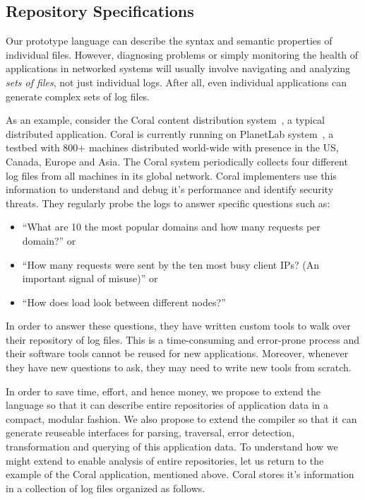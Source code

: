 \subsection{Repository Specifications}
\label{ssec:repo-spec}

Our prototype \pads{} language can describe the syntax and semantic properties
of individual files.  However, diagnosing problems or simply monitoring
the health of applications in networked systems
will usually involve navigating and analyzing {\em sets of files},
not just individual logs.  After all, even individual
applications can generate complex sets of log files.  

As an example, consider the Coral content
distribution system~\cite{coral}, a typical distributed application.
Coral is currently running on PlanetLab system~\cite{planetlab}, a
testbed with 800+ machines distributed world-wide with presence in the
US, Canada, Europe and Asia.  The Coral system periodically collects
four different log files from all machines in its global network.
Coral implementers use this information to understand and debug
it's performance and identify security threats.  They regularly probe the
logs to answer specific questions such as:
\begin{itemize}
\item ``What are 10 the most popular domains and how many requests per 
  domain?'' or
\item ``How many requests were sent by the ten most busy client IPs? (An important signal of misuse)'' or
\item ``How does load look between different nodes?''
\end{itemize}

In order to answer these questions, they have written custom tools
to walk over their repository of log files.  This is a time-consuming and 
error-prone process and their software tools cannot be reused for new 
applications. Moreover, whenever they have new questions to ask, they may
need to write new tools from scratch.

In order to save time, effort, and hence money, we propose to
extend the \pads{} language so that it can describe entire
repositories of application data in a compact, modular fashion.  We
also propose to extend the \pads{} compiler so that it can generate
reuseable interfaces for parsing, traversal, error detection,
transformation and querying of this application data.
To understand how we might extend \pads{} to enable analysis of
entire repositories, let us return to the example of the Coral application, 
mentioned above.  Coral stores it's information in a collection of
log files organized as follows.

